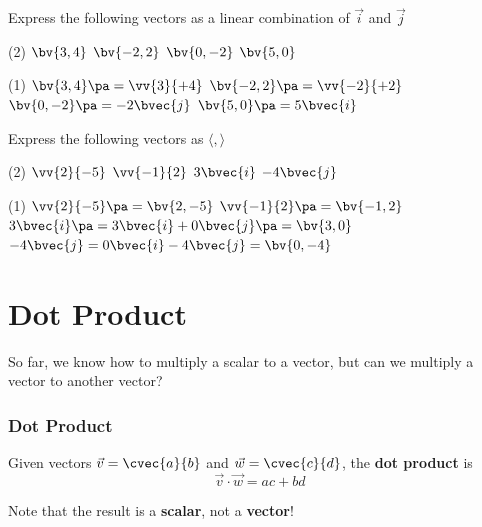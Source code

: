 \begin{frame}[t]
\begin{ex}{}
Express the following vectors as a linear combination of $\vec{i}$ and $\vec{j}$ 
\begin{tasks}(2)
\task $\bv{3,4} $
\task $\bv{-2,2}$
\task $\bv{0,-2}$
\task $\bv{5,0}$
\end{tasks}
\end{ex}
\begin{sol}
\begin{tasks}(1)
\task $\bv{3,4} \pa = \vv{3}{+4}$ \pa
\task $\bv{-2,2} \pa= \vv{-2}{+2}$ \pa
\task $\bv{0,-2} \pa= -2 \bvec{j}$ \pa
\task $\bv{5,0} \pa = 5\bvec{i}$
\end{tasks}
\end{sol}
\end{frame}


\begin{frame}[t]
\begin{ex}{}
Express the following vectors as $\langle , \rangle$
\begin{tasks}(2)
\task $\vv{2}{-5} $
\task $\vv{-1}{2}$
\task $3\bvec{i}$
\task $-4\bvec{j}$
\end{tasks}
\end{ex}
\begin{sol}
\begin{tasks}(1)
\task $\vv{2}{-5} \pa = \bv{2,-5}$ \pa
\task $\vv{-1}{2} \pa = \bv{-1,2}$ \pa
\task $3\bvec{i} \pa = 3\bvec{i} + 0\bvec{j} \pa = \bv{3,0}$ \pa
\task $-4\bvec{j} = 0\bvec{i} - 4\bvec{j} = \bv{0,-4}$
\end{tasks}
\end{sol}
\end{frame}

\section{Dot Product}
\frame{\sectionpage}

\begin{frame}
So far, we know how to multiply a scalar to a vector, but can we multiply a vector to another vector?
\frametitle{Dot Product}
\begin{defn}{}{}
Given vectors $\vec{v} = \cvec{a}{b}$ and $\vec{w} = \cvec{c}{d}$, the \textbf{dot product} is 
\begin{equation}
\vec{v} \cdot \vec{w} = ac + bd
\end{equation}
\end{defn}
Note that the result is a \textbf{scalar}, not a \textbf{vector}!
\end{frame}


